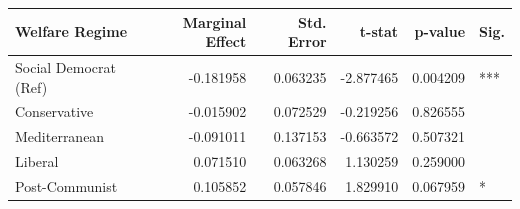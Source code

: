 \begin{tabular}{lrrrrl}
\toprule
Welfare Regime & Marginal Effect & Std. Error & t-stat & p-value & Sig. \\
\midrule
Social Democrat (Ref) & -0.181958 & 0.063235 & -2.877465 & 0.004209 & *** \\
Conservative & -0.015902 & 0.072529 & -0.219256 & 0.826555 &  \\
Mediterranean & -0.091011 & 0.137153 & -0.663572 & 0.507321 &  \\
Liberal & 0.071510 & 0.063268 & 1.130259 & 0.259000 &  \\
Post-Communist & 0.105852 & 0.057846 & 1.829910 & 0.067959 & * \\
\bottomrule
\end{tabular}
